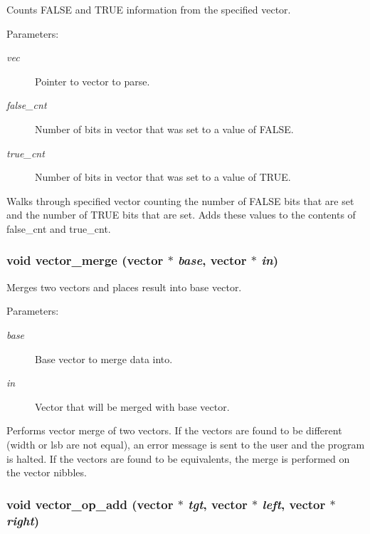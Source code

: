 Counts FALSE and TRUE information from the specified vector.

\begin{Desc}
\item[Parameters: ]\par
\begin{description}
\item[{\em 
vec}]Pointer to vector to parse. \item[{\em 
false\_\-cnt}]Number of bits in vector that was set to a value of FALSE. \item[{\em 
true\_\-cnt}]Number of bits in vector that was set to a value of TRUE.\end{description}
\end{Desc}
Walks through specified vector counting the number of FALSE bits that are set and the number of TRUE bits that are set. Adds these values to the contents of false\_\-cnt and true\_\-cnt. 
\subsubsection{\setlength{\rightskip}{0pt plus 5cm}void vector\_\-merge ({\bf vector} $\ast$ {\em base}, {\bf vector} $\ast$ {\em in})}\label{vector_8c_a9}


Merges two vectors and places result into base vector.

\begin{Desc}
\item[Parameters: ]\par
\begin{description}
\item[{\em 
base}]Base vector to merge data into. \item[{\em 
in}]Vector that will be merged with base vector.\end{description}
\end{Desc}
Performs vector merge of two vectors. If the vectors are found to be different (width or lsb are not equal), an error message is sent to the user and the program is halted. If the vectors are found to be equivalents, the merge is performed on the vector nibbles. 
\subsubsection{\setlength{\rightskip}{0pt plus 5cm}void vector\_\-op\_\-add ({\bf vector} $\ast$ {\em tgt}, {\bf vector} $\ast$ {\em left}, {\bf vector} $\ast$ {\em right})}\label{vector_8c_a35}


